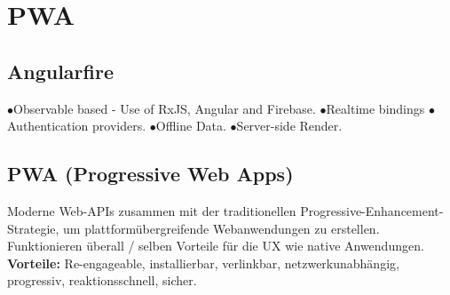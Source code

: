 


\section{PWA}

\subsection{Angularfire}
$\bullet$Observable based - Use of RxJS, Angular and Firebase.
$\bullet$Realtime bindings
$\bullet$Authentication providers.
$\bullet$Offline Data.
$\bullet$Server-side Render.

\subsection{PWA (Progressive Web Apps)}
Moderne Web-APIs zusammen mit der traditionellen Progressive-Enhancement-Strategie, um plattformübergreifende Webanwendungen zu erstellen. Funktionieren überall / selben Vorteile für die UX wie native Anwendungen. \textbf{Vorteile:} Re-engageable, installierbar, verlinkbar, netzwerkunabhängig, progressiv, reaktionsschnell, sicher.


\vfill
$ $
\columnbreak